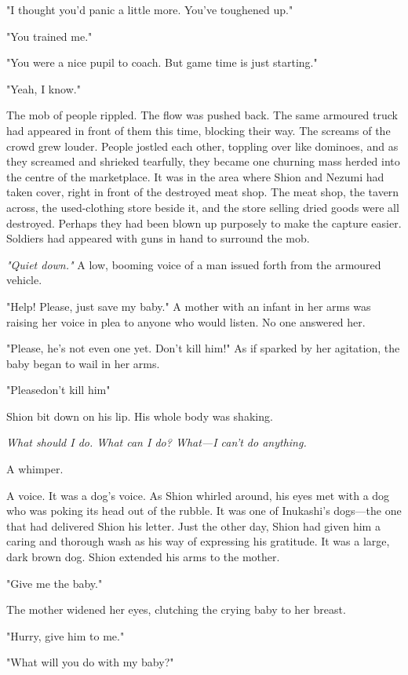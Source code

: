 "I thought you'd panic a little more. You've toughened up."

"You trained me."

"You were a nice pupil to coach. But game time is just starting."

"Yeah, I know."

The mob of people rippled. The flow was pushed back. The same armoured
truck had appeared in front of them this time, blocking their way. The
screams of the crowd grew louder. People jostled each other, toppling
over like dominoes, and as they screamed and shrieked tearfully, they
became one churning mass herded into the centre of the marketplace. It
was in the area where Shion and Nezumi had taken cover, right in front
of the destroyed meat shop. The meat shop, the tavern across, the
used-clothing store beside it, and the store selling dried goods were
all destroyed. Perhaps they had been blown up purposely to make the
capture easier. Soldiers had appeared with guns in hand to surround the
mob.

\emph{"Quiet down."} A low, booming voice of a man issued forth from the
armoured vehicle.

"Help! Please, just save my baby." A mother with an infant in her arms
was raising her voice in plea to anyone who would listen. No one
answered her.

"Please, he's not even one yet. Don't kill him!" As if sparked by her
agitation, the baby began to wail in her arms.

"Please\el don't kill him\el "

Shion bit down on his lip. His whole body was shaking.

\emph{What should I do. What can I do? What---I can't do anything.}

A whimper.

A voice. It was a dog's voice. As Shion whirled around, his eyes met
with a dog who was poking its head out of the rubble. It was one of
Inukashi's dogs---the one that had delivered Shion his letter. Just the
other day, Shion had given him a caring and thorough wash as his way of
expressing his gratitude. It was a large, dark brown dog. Shion extended
his arms to the mother.

"Give me the baby."

The mother widened her eyes, clutching the crying baby to her breast.

"Hurry, give him to me."

"What will you do with my baby?"

